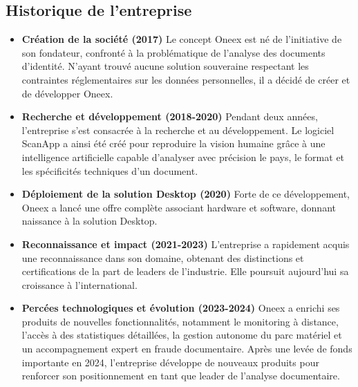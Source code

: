 \subsection{Historique de l’entreprise}

\begin{itemize}
	\item \textbf{Création de la société (2017)}
	      Le concept Oneex est né de l’initiative de son fondateur, confronté à la problématique de l’analyse des documents d’identité. N’ayant trouvé aucune solution souveraine respectant les contraintes réglementaires sur les données personnelles, il a décidé de créer et de développer Oneex.

	\item \textbf{Recherche et développement (2018-2020)}
	      Pendant deux années, l’entreprise s’est consacrée à la recherche et au développement. Le logiciel ScanApp a ainsi été créé pour reproduire la vision humaine grâce à une intelligence artificielle capable d’analyser avec précision le pays, le format et les spécificités techniques d’un document.

	\item \textbf{Déploiement de la solution Desktop (2020)}
	      Forte de ce développement, Oneex a lancé une offre complète associant hardware et software, donnant naissance à la solution Desktop.

	\item \textbf{Reconnaissance et impact (2021-2023)}
	      L’entreprise a rapidement acquis une reconnaissance dans son domaine, obtenant des distinctions et certifications de la part de leaders de l’industrie. Elle poursuit aujourd’hui sa croissance à l’international.

	\item \textbf{Percées technologiques et évolution (2023-2024)}
	      Oneex a enrichi ses produits de nouvelles fonctionnalités, notamment le monitoring à distance, l’accès à des statistiques détaillées, la gestion autonome du parc matériel et un accompagnement expert en fraude documentaire. Après une levée de fonds importante en 2024, l’entreprise développe de nouveaux produits pour renforcer son positionnement en tant que leader de l’analyse documentaire.
\end{itemize}


